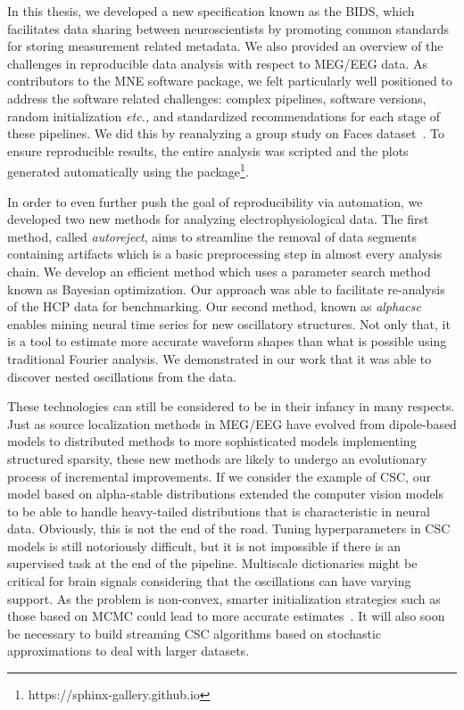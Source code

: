 In this thesis, we developed a new specification known as the \ac{BIDS}, which facilitates data sharing between neuroscientists by promoting common standards for storing measurement related metadata. We also provided an overview of the challenges in reproducible data analysis with respect to \ac{MEG}/\ac{EEG} data. As contributors to the MNE software package, we felt particularly well positioned to address  the software related challenges: complex pipelines, software versions, random initialization \emph{etc.,} and standardized recommendations for each stage of these pipelines. We did this by reanalyzing a group study on Faces dataset~\citep{wakeman2015multi}. To ensure reproducible results, the entire analysis was scripted and the plots generated automatically using the  package\footnote{https://sphinx-gallery.github.io}.

In order to even further push the goal of reproducibility via automation, we developed two new methods for analyzing electrophysiological data. The first method, called \emph{autoreject}, aims to streamline the removal of data segments containing artifacts which is a basic preprocessing step in almost every analysis chain. We develop an efficient method which uses a parameter search method known as Bayesian optimization. Our approach was able to facilitate re-analysis of the \ac{HCP} data for benchmarking. Our second method, known as \emph{alphacsc} enables mining neural time series for new oscillatory structures. Not only that, it is a tool to estimate more accurate waveform shapes than what is possible using traditional Fourier analysis. We demonstrated in our work that it was able to discover nested oscillations from the data.

These technologies can still be considered to be in their infancy in many respects. Just as source localization methods in \ac{MEG}/\ac{EEG} have evolved from dipole-based models to distributed methods to more sophisticated models implementing structured sparsity, these new methods are likely to undergo an evolutionary process of incremental improvements. If we consider the example of \ac{CSC}, our model based on alpha-stable distributions extended the computer vision models to be able to handle heavy-tailed distributions that is characteristic in neural data. Obviously, this is not the end of the road. Tuning hyperparameters in \ac{CSC} models is still notoriously difficult, but it is not impossible if there is an supervised task at the end of the pipeline. Multiscale dictionaries might be critical for brain signals considering that the oscillations can have varying support. As the problem is non-convex, smarter initialization strategies such as those based on \ac{MCMC} could lead to more accurate estimates~\citep{bachem2016fast}. It will also soon be necessary to build streaming \ac{CSC} algorithms based on stochastic approximations to deal with larger datasets.

